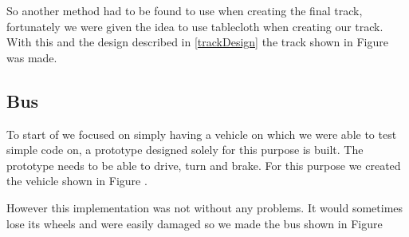So another method had to be found to use when creating the final track, fortunately we were given the idea to use tablecloth when creating our track. With this and the design described in \ref{trackDesign} the track shown in Figure  was made.




\subsection{Bus}
To start of we focused on simply having a vehicle on which we were able to test simple code on, a prototype designed solely for this purpose is built. The prototype needs to be able to drive, turn and brake. For this purpose we created the vehicle shown in Figure .


However this implementation was not without any problems. It would sometimes lose its wheels and were easily damaged so we made the bus shown in Figure 


